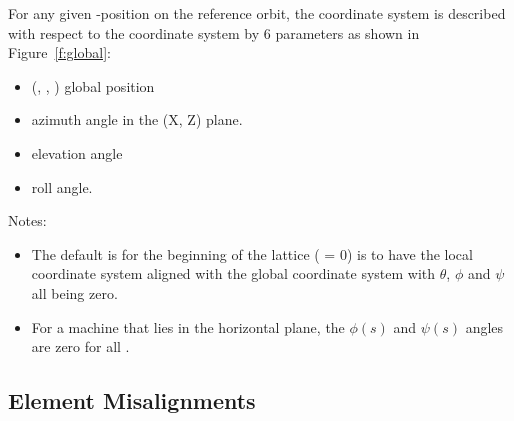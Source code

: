 \documentclass{hitec}     %
\begin{document}
{For any given -position on the reference orbit, the  coordinate system is described with
respect to the  coordinate system by 6 parameters as shown in Figure~\ref{f:global}:
\vspace{-5 pt}
\begin{itemize}
\item (, , ) global position
\item \vn{$\theta$} azimuth angle in the (X, Z) plane.
\item \vn{$\phi$} elevation angle
\item \vn{$\psi$} roll angle.
\end{itemize}

Notes:
\vspace{-5 pt}
\begin{itemize}
\item 
The default is for the beginning of the lattice ( = 0) is to have the local 
coordinate system aligned with the global  coordinate system with $\theta$, $\phi$ and
$\psi$ all being zero.
\item 
For a machine that lies in the horizontal plane, the $\phi(s)$ and $\psi(s)$ angles are zero for all
.
\end{itemize}

\newpage

\subsection{Element Misalignments}
\label{s:ele.mis}

}
\end{document}
